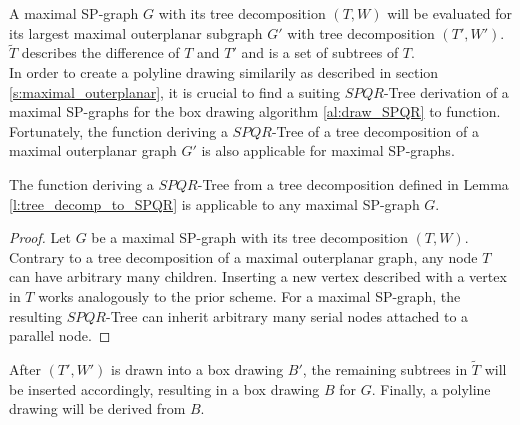 A maximal SP-graph $G$ with its tree decomposition $(T,W)$ will be evaluated for its largest maximal outerplanar subgraph $G'$ with tree decomposition $(T',W')$. $\tilde{T}$ describes the difference of $T$ and $T'$ and is a set of subtrees of $T$.\\
In order to create a polyline drawing similarily as described in section \ref{s:maximal_outerplanar}, it is crucial to find a suiting $SPQR$-Tree derivation of a maximal SP-graphs for the box drawing algorithm \ref{al:draw_SPQR} to function. Fortunately, the function deriving a $SPQR$-Tree of a tree decomposition of a maximal outerplanar graph $G'$ is also applicable for maximal SP-graphs.
\begin{lemma}
	The function deriving a $SPQR$-Tree from a tree decomposition defined in Lemma \ref{l:tree_decomp_to_SPQR} is applicable to any maximal SP-graph $G$.
\end{lemma}
\begin{proof}
	Let $G$ be a maximal SP-graph with its tree decomposition $(T,W)$. Contrary to a tree decomposition of a maximal outerplanar graph, any node $T$ can have arbitrary many children. Inserting a new vertex described with a vertex in $T$ works analogously to the prior scheme. For a maximal SP-graph, the resulting $SPQR$-Tree can inherit arbitrary many serial nodes attached to a parallel node.
\end{proof}

After $(T',W')$ is drawn into a box drawing $B'$, the remaining subtrees in $\tilde{T}$ will be inserted accordingly, resulting in a box drawing $B$ for $G$. Finally, a polyline drawing will be derived from $B$.

